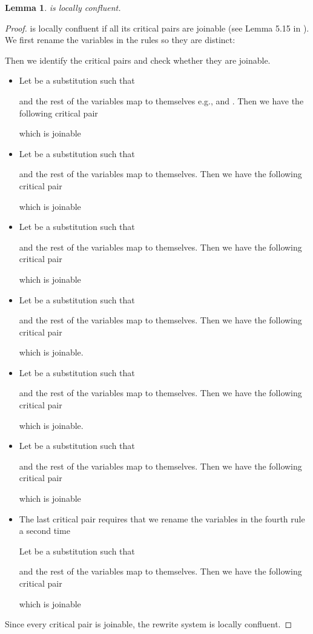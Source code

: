 \documentclass[a4paper,twoside,openright]{report}
\newtheorem{lem}[theorem]{Lemma}
\begin{document}
\begin{lem}
 is locally confluent.
\end{lem}
\begin{proof}
 is locally confluent if all its critical pairs are joinable (see Lemma 5.15 in \cite{rewriting}). We first rename the variables in the rules so they are distinct:

Then we identify the critical pairs and check whether they are joinable.

\begin{itemize}

\item Let  be a substitution such that

and the rest of the variables map to themselves e.g.,  and . Then we have the following critical pair

which is joinable


\item Let  be a substitution such that

and the rest of the variables map to themselves. Then we have the following critical pair

which is joinable


\item Let  be a substitution such that

and the rest of the variables map to themselves. Then we have the following critical pair

which is joinable


\item Let  be a substitution such that

and the rest of the variables map to themselves. Then we have the following critical pair

which is joinable.

\item Let  be a substitution such that

and the rest of the variables map to themselves. Then we have the following critical pair

which is joinable.

\item Let  be a substitution such that

and the rest of the variables map to themselves. Then we have the following critical pair

which is joinable


\item The last critical pair requires that we rename the variables in the fourth rule a second time

Let  be a substitution such that

and the rest of the variables map to themselves. Then we have the following critical pair

which is joinable



\end{itemize}
Since every critical pair is joinable, the rewrite system  is locally confluent.
\end{proof}
\end{document}
